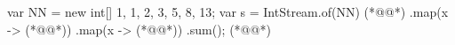 
\begin{ffcode}
var NN = new int[] {1, 1, 2, 3, 5, 8, 13};
var s = IntStream.of(NN) (*@\label{ln:stream-start}@*)
  .map(x -> (*@@*))
  .map(x -> (*@@*))
  .sum(); (*@\label{ln:stream-end}@*)
\end{ffcode}

